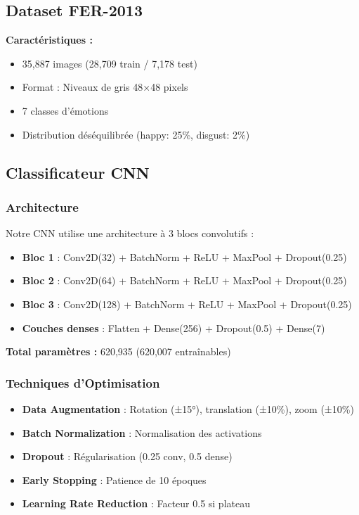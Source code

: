 \documentclass[12pt,a4paper]{article}
\begin{document}
\subsection{Dataset FER-2013}

\textbf{Caractéristiques :}
\begin{itemize}
    \item 35,887 images (28,709 train / 7,178 test)
    \item Format : Niveaux de gris 48×48 pixels
    \item 7 classes d'émotions
    \item Distribution déséquilibrée (happy: 25\%, disgust: 2\%)
\end{itemize}

\subsection{Classificateur CNN}

\subsubsection{Architecture}
Notre CNN utilise une architecture à 3 blocs convolutifs :
\begin{itemize}
    \item \textbf{Bloc 1} : Conv2D(32) + BatchNorm + ReLU + MaxPool + Dropout(0.25)
    \item \textbf{Bloc 2} : Conv2D(64) + BatchNorm + ReLU + MaxPool + Dropout(0.25)
    \item \textbf{Bloc 3} : Conv2D(128) + BatchNorm + ReLU + MaxPool + Dropout(0.25)
    \item \textbf{Couches denses} : Flatten + Dense(256) + Dropout(0.5) + Dense(7)
\end{itemize}

\textbf{Total paramètres :} 620,935 (620,007 entraînables)

\subsubsection{Techniques d'Optimisation}
\begin{itemize}
    \item \textbf{Data Augmentation} : Rotation (±15°), translation (±10\%), zoom (±10\%)
    \item \textbf{Batch Normalization} : Normalisation des activations
    \item \textbf{Dropout} : Régularisation (0.25 conv, 0.5 dense)
    \item \textbf{Early Stopping} : Patience de 10 époques
    \item \textbf{Learning Rate Reduction} : Facteur 0.5 si plateau
\end{itemize}
\end{document}
